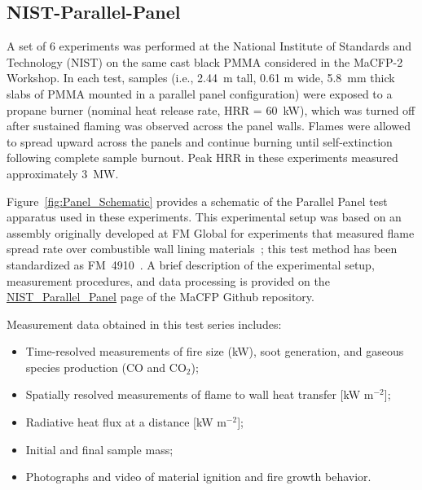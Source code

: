 \documentclass[12pt]{article}
\begin{document}
\FloatBarrier
\subsection {NIST-Parallel-Panel}
A set of 6 experiments was performed at the National Institute of Standards and Technology (NIST) on the same cast black PMMA considered in the MaCFP-2 Workshop. In each test, samples (i.e., 2.44~m tall, 0.61 m wide, 5.8~mm thick slabs of PMMA mounted in a parallel panel configuration) were exposed to a propane burner (nominal heat release rate, HRR = 60~kW), which was turned off after sustained flaming was observed across the panel walls. Flames were allowed to spread upward across the panels and continue burning until self-extinction following complete sample burnout. Peak HRR in these experiments measured approximately 3~MW.

Figure~\ref{fig:Panel_Schematic} provides a schematic of the Parallel Panel test apparatus used in these experiments. This experimental setup was based on an assembly originally developed at FM Global for experiments that measured flame spread rate over combustible wall lining materials~\cite{Beaulieu2007Parallel}; this test method has been standardized as FM~4910~\cite{FM-4910standard}. A brief description of the experimental setup, measurement procedures, and data processing is provided on the \href{https://github.com/MaCFP/macfp-db/tree/master/Fire_Growth/NIST_Parallel_Panel}{NIST\_Parallel\_Panel} page of the MaCFP Github repository.

\clearpage
Measurement data obtained in this test series includes:
\begin{itemize}[noitemsep]
\item Time-resolved measurements of fire size (kW), soot generation, and gaseous species production (CO and CO$_2$);
\item Spatially resolved measurements of flame to wall heat transfer [kW m$^{-2}$];
\item Radiative heat flux at a distance [kW m$^{-2}$];
\item Initial and final sample mass;
\item Photographs and video of material ignition and fire growth behavior.
\end{itemize}
\end{document}
